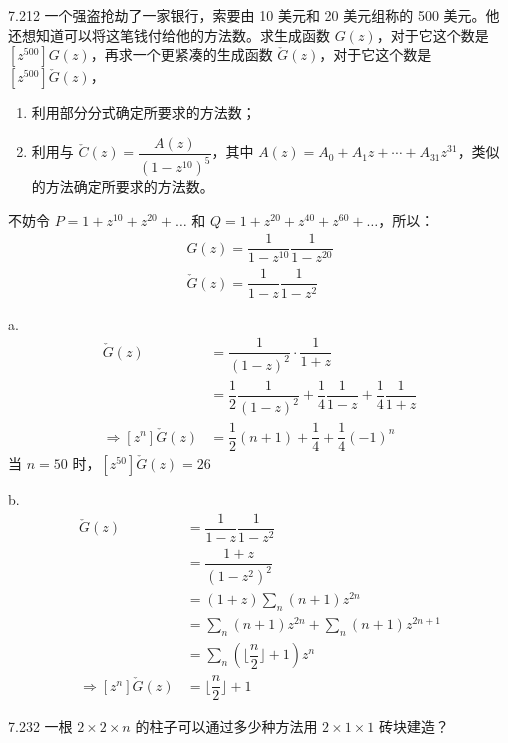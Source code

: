 \begin{problem}{7.21}{2}
  一个强盗抢劫了一家银行，索要由 10 美元和 20 美元组称的 500 美元。他还想知道可以将这笔钱付给他的方法数。求生成函数 \( G(z) \)，对于它这个数是 \( [z^{500}] G(z) \)，再求一个更紧凑的生成函数 \( \check{G}(z) \)，对于它这个数是 \( [z^{500}] \check{G}(z) \)，
  \begin{enumerate}
    \item[a] 利用部分分式确定所要求的方法数；
    \item[b] 利用与 \( \check{C}(z) = \dfrac{A(z)}{(1-z^{10})^5} \)，其中 \( A(z) = A_0 + A_1 z + \cdots + A_{31} z^{31} \)，类似的方法确定所要求的方法数。
  \end{enumerate}
\end{problem}

不妨令 \( P = 1 + z^{10} + z^{20} + \dots \) 和 \( Q = 1 + z^{20} + z^{40} + z^{60} + \dots \)，所以：
\begin{gather*}
  G(z) = \dfrac{1}{1-z^{10}} \dfrac{1}{1-z^{20}} \\
  \check{G}(z) = \dfrac{1}{1-z} \dfrac{1}{1-z^2}
\end{gather*}

a.
\begin{align*}
  \check{G}(z) &= \dfrac{1}{(1-z)^2} \cdot \dfrac{1}{1+z} \\
  &= \dfrac{1}{2} \dfrac{1}{(1-z)^2} + \dfrac{1}{4} \dfrac{1}{1-z} + \dfrac{1}{4} \dfrac{1}{1+z} \\
  \Rightarrow [z^n] \check{G}(z) &= \dfrac{1}{2} (n+1) + \dfrac{1}{4} + \dfrac{1}{4} (-1)^n
\end{align*}
当 \( n = 50 \) 时，\( [z^{50}] \check{G}(z) = 26 \)

b.
\begin{align*}
  \check{G}(z) &= \dfrac{1}{1-z} \dfrac{1}{1-z^2} \\
  &= \dfrac{1+z}{(1-z^2)^2} \\
  &= (1+z) \sum_n (n+1) z^{2n} \\
  &= \sum_n (n+1) z^{2n} + \sum_n (n+1) z^{2n+1} \\
  &= \sum_n \left( \lfloor \dfrac{n}{2} \rfloor  + 1 \right) z^n \\
  \Rightarrow [z^n] \check{G}(z) &= \lfloor \dfrac{n}{2} \rfloor + 1
\end{align*}

\begin{problem}{7.23}{2}
  一根 \( 2 \times 2 \times n \) 的柱子可以通过多少种方法用 \( 2 \times 1 \times 1 \) 砖块建造？
\end{problem}

